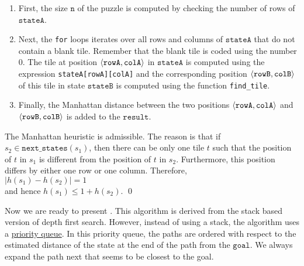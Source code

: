 \begin{enumerate}
      \begin{enumerate}
      \item First, the size $\texttt{n}$ of the puzzle is computed by checking the number of rows of
            $\texttt{stateA}$.
      \item Next, the \texttt{for} loops iterates over all rows and columns of $\texttt{stateA}$ that do not
            contain a blank tile.  Remember that the blank tile is coded using the number $0$.  The tile at
            position $\pair(\mathtt{rowA}, \mathtt{colA})$ in $\texttt{stateA}$ is computed using the expression \texttt{stateA[rowA][colA]} and the
            corresponding position $\pair(\mathtt{rowB}, \mathtt{colB})$ of this tile in state $\texttt{stateB}$ is computed using the function
            \texttt{find\_tile}.
      \item Finally, the Manhattan distance between the two positions $\pair(\mathtt{rowA}, \mathtt{colA})$ and
            $\pair(\mathtt{rowB}, \mathtt{colB})$ is added to the $\texttt{result}$.
      \end{enumerate}

    The Manhattan heuristic is admissible.  The reason is that if $s_2 \in \mathtt{next\_states}(s_1)$,
    then there can be only one tile $t$ such that the position of $t$ in $s_1$ is different from the position
    of $t$ in $s_2$.  Furthermore, this position differs by either one row or one column.  Therefore,
    \\[0.2cm]
    \hspace*{1.3cm}
    $|h(s_1) - h(s_2)| = 1$
    \\[0.2cm]
    and hence $h(s_1) \leq 1 + h(s_2)$.  \qed
\end{enumerate}
Now we are ready to present .  This algorithm is derived from the stack based
version of depth first search.  However, instead of using a stack, the algorithm uses a
\href{https://en.wikipedia.org/wiki/Priority_queue}{priority queue}.  In this priority queue, the paths are
ordered with respect to the estimated distance of the state at the end of the path from the $\texttt{goal}$.
We always expand the path next that seems to be closest to the goal.

